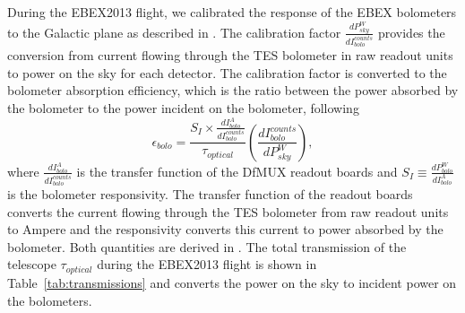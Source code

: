 \documentclass[../EBEXPaper2.tex]{subfiles}
\begin{document}
During the \ac{EBEX2013} flight, we calibrated the response of the \ac{EBEX} bolometers to the Galactic plane as described in \citep{Aubin_MGrossman2015}.
The calibration factor $\frac{d P_{sky}^W}{d I_{bolo}^{counts}}$ provides the conversion from current flowing through the TES bolometer in raw readout units to power on the sky for each detector.
The calibration factor is converted to the bolometer absorption efficiency, which is the ratio between the power absorbed by the bolometer to the power incident on the bolometer, following
\begin{equation}
\epsilon_{bolo} = \frac{ S_I \times \frac{d I_{bolo}^A}{d I_{bolo}^{counts}}}{ \tau_{optical}} \left( \frac{d I_{bolo}^{counts}}{d P_{sky}^W} \right),
\label{eq:bolo_efficiency_form_calib}
\end{equation}
where $\frac{d I_{bolo}^A}{d I_{bolo}^{counts}}$ is the transfer function of the DfMUX readout boards and $S_I \equiv \frac{d P_{bolo}^W}{d I_{bolo}^A}$ is the bolometer responsivity.
The transfer function of the readout boards converts the current flowing through the TES bolometer from raw readout units to Ampere and the responsivity converts this current to power absorbed by the bolometer.
Both quantities are derived in \citep{aubin_thesis}.
The total transmission of the telescope $\tau_{optical}$ during the \ac{EBEX2013} flight is shown in Table~\ref{tab:transmissions} and converts the power on the sky to incident power on the bolometers.
\end{document}
